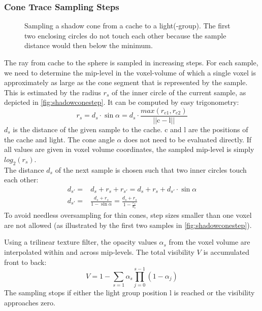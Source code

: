 \documentclass[thesis.tex]{subfiles}
\begin{document}
\subsubsection{Cone Trace Sampling Steps}
\begin{figure}[h]
	\centering
	\caption{Sampling a shadow cone from a cache to a light(-group). The first two enclosing circles do not touch each other because the sample distance would then below the minimum.} \label{fig:shadowconestep}
\end{figure}
The ray from cache to the sphere is sampled in increasing steps.
For each sample, we need to determine the mip-level in the voxel-volume of which a single voxel is approximately as large as the cone segment that is represented by the sample.
This is estimated by the radius $r_s$ of the inner circle of the current sample, as depicted in \autoref{fig:shadowconestep}.
It can be computed by easy trigonometry:
\begin{equation}
r_s = d_s \cdot \sin \alpha = d_s \cdot \frac{max(r_{e1}, r_{e2})}{||\mathrm{c} - \mathrm{l}||}
\end{equation}
$d_s$ is the distance of the given sample to the cache. $\mathrm{c}$ and $\mathrm{l}$ are the positions of the cache and light.
The cone angle $\alpha$ does not need to be evaluated directly. %
If all values are given in voxel volume coordinates, the sampled mip-level is simply $log_2(r_s)$.\\
The distance $d_s$ of the next sample is chosen such that two inner circles touch each other:
\begin{align}
d_{s'} =& d_s + r_s + r_{s'} = d_s + r_s + d_{s'} \cdot \sin \alpha\\
d_{s'} =& \frac{d_s + r_s}{1-\sin\alpha} = \frac{d_s + r_s}{1-\frac{r_s}{d_s}} 
\end{align}
To avoid needless oversampling for thin cones, step sizes smaller than one voxel are not allowed (as illustrated by the first two samples in \autoref{fig:shadowconestep}).

Using a trilinear texture filter, the opacity values $\alpha_s$ from the voxel volume are interpolated within and across mip-levels.
The total visibility $V$ is accumulated front to back:
\begin{equation}
V = 1 - \sum\limits_{s=1}\alpha_s \prod\limits_{j=0}^{s-1}(1-\alpha_j)
\end{equation}
The sampling stops if either the light group position $\mathrm{l}$ is reached or the visibility approaches zero.
\end{document}
